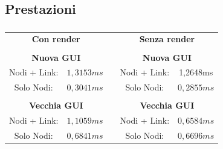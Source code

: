 \documentclass[%
]{beamer}
\begin{document}
    \subsection{Prestazioni}\label{subsec:benchmark}
    \begin{frame}
        \frametitle{\insertsection}
        \framesubtitle{\insertsubsection}
        \centering
        \begin{tabular}{ccccc}
            \multicolumn{2}{c}{\textbf{Con render}} &  & \multicolumn{2}{c}{\textbf{Senza render}} \\
             &  &  &  &  \\ \cline{1-2} \cline{4-5}
            \multicolumn{2}{|c|}{\textbf{Nuova GUI}} & \multicolumn{1}{c|}{} & \multicolumn{2}{c|}{\textbf{Nuova GUI}} \\ \cline{1-2} \cline{4-5}
            \multicolumn{1}{|c|}{Nodi + Link:} & \multicolumn{1}{c|}{$1,3153ms$} & \multicolumn{1}{c|}{} & \multicolumn{1}{c|}{Nodi + Link:} & \multicolumn{1}{c|}{1,2648ms} \\ \cline{1-2} \cline{4-5}
            \multicolumn{1}{|c|}{Solo Nodi:} & \multicolumn{1}{c|}{$0,3041ms$} & \multicolumn{1}{c|}{} & \multicolumn{1}{c|}{Solo Nodi:} & \multicolumn{1}{c|}{$0,2855ms$} \\ \cline{1-2} \cline{4-5}
             &  &  &  &  \\ \cline{1-2} \cline{4-5}
            \multicolumn{2}{|c|}{\textbf{Vecchia GUI}} & \multicolumn{1}{c|}{} & \multicolumn{2}{c|}{\textbf{Vecchia GUI}} \\ \cline{1-2} \cline{4-5}
            \multicolumn{1}{|c|}{Nodi + Link:} & \multicolumn{1}{c|}{$1,1059ms$} & \multicolumn{1}{c|}{} & \multicolumn{1}{c|}{Nodi + Link:} & \multicolumn{1}{c|}{$0,6584ms$} \\ \cline{1-2} \cline{4-5}
            \multicolumn{1}{|c|}{Solo Nodi:} & \multicolumn{1}{c|}{$0,6841ms$} & \multicolumn{1}{c|}{} & \multicolumn{1}{c|}{Solo Nodi:} & \multicolumn{1}{c|}{$0,6696ms$} \\ \cline{1-2} \cline{4-5}
        \end{tabular}
    \end{frame}

\end{document}
